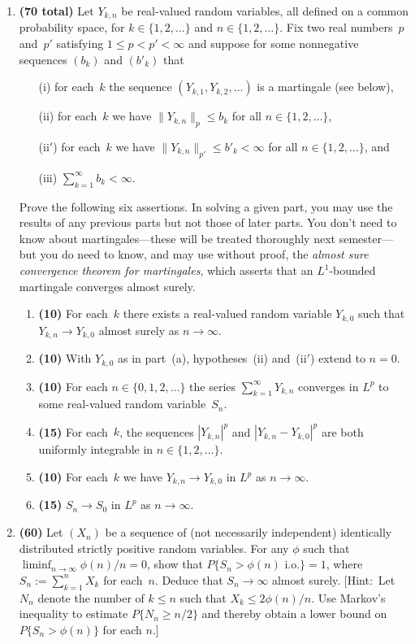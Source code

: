 \documentclass[letterpaper, 12pt]{article}
\begin{document}
\begin{enumerate}
\item {\bf (70 total)} Let $Y_{k, n}$ be real-valued random variables, all defined on a common probability space, for 
$k \in \{1, 2, \dots\}$ and $n \in \{1, 2, \dots\}$.  Fix two real numbers~$p$ and~$p'$ satisfying $1 \leq p < p' < \infty$ and suppose for some nonnegative sequences $(b_k)$ and $(b'_k)$ that
\begin{enumerate}
\item[(i)] for each~$k$ the sequence $(Y_{k, 1}, Y_{k, 2}, \dots)$ is a martingale (see below),
\item[(ii)] for each~$k$ we have $\| Y_{k, n} \|_p \leq b_k$ for all $n \in \{1, 2, \dots\}$,
\item[(ii$'$)] for each~$k$ we have $\| Y_{k, n} \|_{p'} \leq b'_k < \infty$ for all $n \in \{1, 2, \dots\}$, and
\item[(iii)] $\sum_{k = 1}^{\infty} b_k < \infty$.
\end{enumerate}
Prove the following six assertions.  In solving a given part, you may use the results of any previous parts but not those of later parts.  You don't need to know about martingales---these will be treated thoroughly next semester---but you do need to know, and may use without proof, the \emph{almost sure convergence theorem for martingales}, which asserts that an $L^1$-bounded martingale converges almost surely.
\begin{enumerate}
\item {\bf (10)} For each~$k$ there exists a real-valued random variable $Y_{k, 0}$ such that $Y_{k, n} \to Y_{k, 0}$ almost surely as $n \to \infty$.
\item {\bf (10)} With $Y_{k, 0}$ as in part~(a), hypotheses~(ii) and~(ii$'$) extend to $n = 0$.
\item {\bf (10)} For each $n \in \{0, 1, 2, \dots\}$ the series $\sum_{k = 1}^{\infty} Y_{k, n}$ converges in $L^p$ to some 
real-valued random variable~$S_n$.
\item {\bf (15)} For each~$k$, the sequences $|Y_{k, n}|^p$ and $|Y_{k, n} - Y_{k, 0}|^p$ are both uniformly integrable in 
$n \in \{1, 2, \dots\}$.
\item {\bf (10)} For each~$k$ we have $Y_{k, n} \to Y_{k, 0}$ in $L^p$ as $n \to \infty$.
\item {\bf (15)} $S_n \to S_0$ in $L^p$ as $n \to \infty$.
\end{enumerate}

\item {\bf (60)} Let $(X_n)$ be a sequence of (not necessarily independent)
identically distributed strictly positive random variables.  For any $\phi$ such
that $\liminf_{n \to \infty} \phi(n)/n = 0$, show that $P\{S_n >
\phi(n) \mbox{\ i.o.}\} = 1$, where $S_n := \sum_{k=1}^n X_k$ for each~$n$. 
Deduce that $S_n \to \infty$ almost surely.
[{\sc Hint:}\ Let $N_n$ denote the number of $k \leq n$ such that $X_k \leq 2
\phi(n)/n$.  Use Markov's inequality to estimate $P\{N_n \geq n/2\}$ and thereby
obtain a lower bound on $P\{S_n > \phi(n)\}$ for each $n$.]



\end{enumerate}
\end{document}
